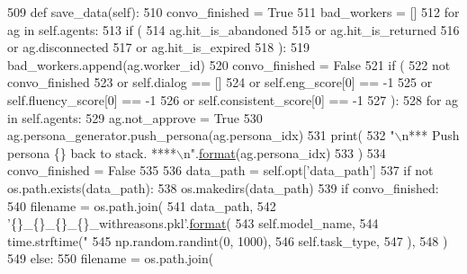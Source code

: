 \begin{DoxyCode}
509     \textcolor{keyword}{def }save\_data(self):
510         convo\_finished = \textcolor{keyword}{True}
511         bad\_workers = []
512         \textcolor{keywordflow}{for} ag \textcolor{keywordflow}{in} self.agents:
513             \textcolor{keywordflow}{if} (
514                 ag.hit\_is\_abandoned
515                 \textcolor{keywordflow}{or} ag.hit\_is\_returned
516                 \textcolor{keywordflow}{or} ag.disconnected
517                 \textcolor{keywordflow}{or} ag.hit\_is\_expired
518             ):
519                 bad\_workers.append(ag.worker\_id)
520                 convo\_finished = \textcolor{keyword}{False}
521         \textcolor{keywordflow}{if} (
522             \textcolor{keywordflow}{not} convo\_finished
523             \textcolor{keywordflow}{or} self.dialog == []
524             \textcolor{keywordflow}{or} self.eng\_score[0] == -1
525             \textcolor{keywordflow}{or} self.fluency\_score[0] == -1
526             \textcolor{keywordflow}{or} self.consistent\_score[0] == -1
527         ):
528             \textcolor{keywordflow}{for} ag \textcolor{keywordflow}{in} self.agents:
529                 ag.not\_approve = \textcolor{keyword}{True}
530                 ag.persona\_generator.push\_persona(ag.persona\_idx)
531                 print(
532                     \textcolor{stringliteral}{"\(\backslash\)n*** Push persona \{\} back to stack. ****\(\backslash\)n"}.\hyperlink{namespaceparlai_1_1chat__service_1_1services_1_1messenger_1_1shared__utils_a32e2e2022b824fbaf80c747160b52a76}{format}(ag.persona\_idx)
533                 )
534             convo\_finished = \textcolor{keyword}{False}
535 
536         data\_path = self.opt[\textcolor{stringliteral}{'data\_path'}]
537         \textcolor{keywordflow}{if} \textcolor{keywordflow}{not} os.path.exists(data\_path):
538             os.makedirs(data\_path)
539         \textcolor{keywordflow}{if} convo\_finished:
540             filename = os.path.join(
541                 data\_path,
542                 \textcolor{stringliteral}{'\{\}\_\{\}\_\{\}\_\{\}\_withreasons.pkl'}.\hyperlink{namespaceparlai_1_1chat__service_1_1services_1_1messenger_1_1shared__utils_a32e2e2022b824fbaf80c747160b52a76}{format}(
543                     self.model\_name,
544                     time.strftime(\textcolor{stringliteral}{"%
545                     np.random.randint(0, 1000),
546                     self.task\_type,
547                 ),
548             )
549         \textcolor{keywordflow}{else}:
550             filename = os.path.join(
}
\end{DoxyCode}
